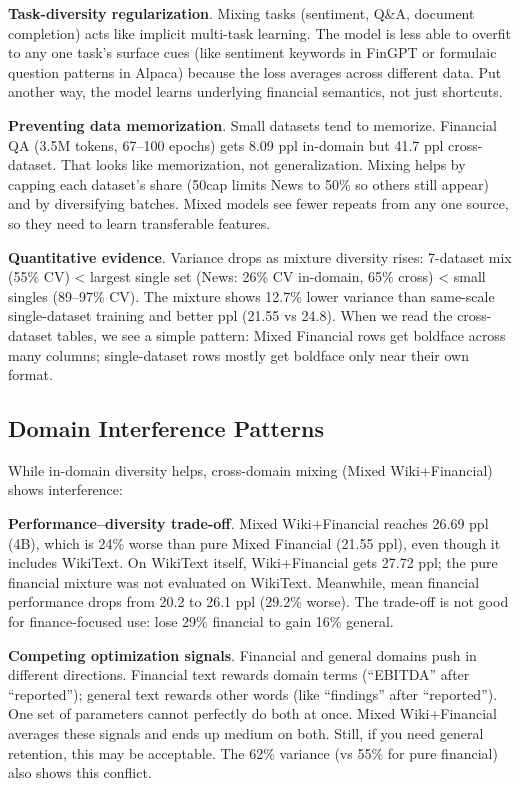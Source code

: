 \textbf{Task-diversity regularization}. Mixing tasks (sentiment, Q\&A, document completion) acts like implicit multi-task learning. The model is less able to overfit to any one task's surface cues (like sentiment keywords in FinGPT or formulaic question patterns in Alpaca) because the loss averages across different data. Put another way, the model learns underlying financial semantics, not just shortcuts.

\textbf{Preventing data memorization}. Small datasets tend to memorize. Financial QA (3.5M tokens, 67--100 epochs) gets 8.09 ppl in-domain but 41.7 ppl cross-dataset. That looks like memorization, not generalization. Mixing helps by capping each dataset's share (50cap limits News to 50\% so others still appear) and by diversifying batches. Mixed models see fewer repeats from any one source, so they need to learn transferable features.

\textbf{Quantitative evidence}. Variance drops as mixture diversity rises: 7-dataset mix (55\% CV) < largest single set (News: 26\% CV in-domain, 65\% cross) < small singles (89--97\% CV). The mixture shows 12.7\% lower variance than same-scale single-dataset training and better ppl (21.55 vs 24.8). When we read the cross-dataset tables, we see a simple pattern: Mixed Financial rows get boldface across many columns; single-dataset rows mostly get boldface only near their own format.

\subsection{Domain Interference Patterns}

While in-domain diversity helps, cross-domain mixing (Mixed Wiki+Financial) shows interference:

\textbf{Performance--diversity trade-off}. Mixed Wiki+Financial reaches 26.69 ppl (4B), which is 24\% worse than pure Mixed Financial (21.55 ppl), even though it includes WikiText. On WikiText itself, Wiki+Financial gets 27.72 ppl; the pure financial mixture was not evaluated on WikiText. Meanwhile, mean financial performance drops from 20.2 to 26.1 ppl (29.2\% worse). The trade-off is not good for finance-focused use: lose 29\% financial to gain 16\% general.

\textbf{Competing optimization signals}. Financial and general domains push in different directions. Financial text rewards domain terms (``EBITDA'' after ``reported''); general text rewards other words (like ``findings'' after ``reported''). One set of parameters cannot perfectly do both at once. Mixed Wiki+Financial averages these signals and ends up medium on both. Still, if you need general retention, this may be acceptable. The 62\% variance (vs 55\% for pure financial) also shows this conflict.

